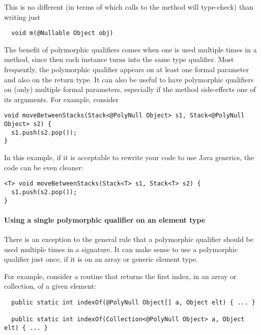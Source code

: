 This is no different (in terms of which calls to the method will
type-check) than writing just

\begin{Verbatim}
  void m(@Nullable Object obj)
\end{Verbatim}

The benefit of polymorphic qualifiers comes when one is used multiple times
in a method, since then each instance turns into the same type qualifier.
Most frequently, the polymorphic qualifier appears on at least one formal
parameter and also on the return type.  It can also be useful to have
polymorphic qualifiers on (only) multiple formal parameters, especially if
the method side-effects one of its arguments.
For example, consider

\begin{Verbatim}
void moveBetweenStacks(Stack<@PolyNull Object> s1, Stack<@PolyNull Object> s2) {
  s1.push(s2.pop());
}
\end{Verbatim}

\noindent
In this example, if it is acceptable to rewrite your code to use Java
generics, the code can be even cleaner:

\begin{Verbatim}
<T> void moveBetweenStacks(Stack<T> s1, Stack<T> s2) {
  s1.push(s2.pop());
}
\end{Verbatim}




\paragraph{Using a single polymorphic qualifier on an element type\label{qualifier-polymorphism-element-types}}

There is an exception to the general rule that a polymorphic qualifier
should be used multiple times in a signature.  It can make sense to use a
polymorphic qualifier just once, if it is on an array or generic element
type.

For example, consider a routine that returns the first index, in an array
or collection, of a given element:

\begin{Verbatim}
  public static int indexOf(@PolyNull Object[] a, Object elt) { ... }

  public static int indexOf(Collection<@PolyNull Object> a, Object elt) { ... }
\end{Verbatim}

